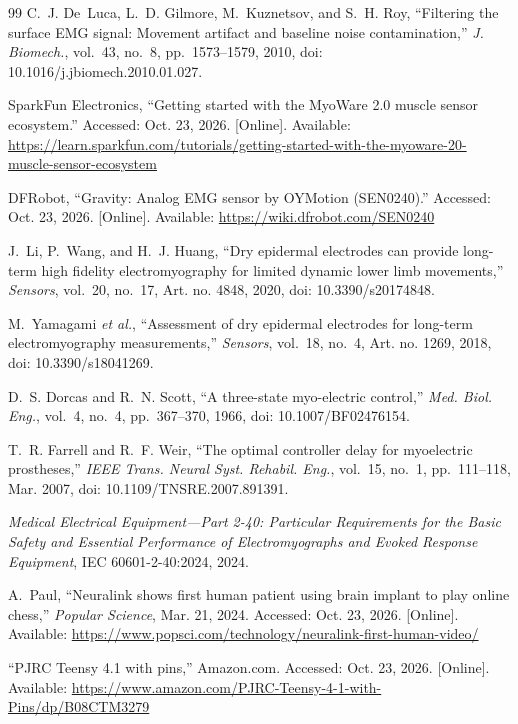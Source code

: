 \documentclass[conference]{IEEEtran}
\begin{document}
\begin{thebibliography}{99}
C.~J. De~Luca, L.~D. Gilmore, M.~Kuznetsov, and S.~H. Roy, ``Filtering the surface EMG signal: Movement artifact and baseline noise contamination,'' \textit{J. Biomech.}, vol.~43, no.~8, pp.~1573--1579, 2010, doi: 10.1016/j.jbiomech.2010.01.027.

SparkFun Electronics, ``Getting started with the MyoWare 2.0 muscle sensor ecosystem.'' Accessed: Oct. 23, 2026. [Online]. Available: \url{https://learn.sparkfun.com/tutorials/getting-started-with-the-myoware-20-muscle-sensor-ecosystem}

DFRobot, ``Gravity: Analog EMG sensor by OYMotion (SEN0240).'' Accessed: Oct. 23, 2026. [Online]. Available: \url{https://wiki.dfrobot.com/SEN0240}

J.~Li, P.~Wang, and H.~J. Huang, ``Dry epidermal electrodes can provide long-term high fidelity electromyography for limited dynamic lower limb movements,'' \textit{Sensors}, vol.~20, no.~17, Art. no. 4848, 2020, doi: 10.3390/s20174848.

M.~Yamagami \textit{et al.}, ``Assessment of dry epidermal electrodes for long-term electromyography measurements,'' \textit{Sensors}, vol.~18, no.~4, Art. no. 1269, 2018, doi: 10.3390/s18041269.

D.~S. Dorcas and R.~N. Scott, ``A three-state myo-electric control,'' \textit{Med. Biol. Eng.}, vol.~4, no.~4, pp.~367--370, 1966, doi: 10.1007/BF02476154.

T.~R. Farrell and R.~F. Weir, ``The optimal controller delay for myoelectric prostheses,'' \textit{IEEE Trans. Neural Syst. Rehabil. Eng.}, vol.~15, no.~1, pp.~111--118, Mar. 2007, doi: 10.1109/TNSRE.2007.891391.

\textit{Medical Electrical Equipment---Part 2-40: Particular Requirements for the Basic Safety and Essential Performance of Electromyographs and Evoked Response Equipment}, IEC 60601-2-40:2024, 2024.

A.~Paul, ``Neuralink shows first human patient using brain implant to play online chess,'' \textit{Popular Science}, Mar. 21, 2024. Accessed: Oct. 23, 2026. [Online]. Available: \url{https://www.popsci.com/technology/neuralink-first-human-video/}

``PJRC Teensy 4.1 with pins,'' Amazon.com. Accessed: Oct. 23, 2026. [Online]. Available: \url{https://www.amazon.com/PJRC-Teensy-4-1-with-Pins/dp/B08CTM3279}


\end{thebibliography}
\end{document}
